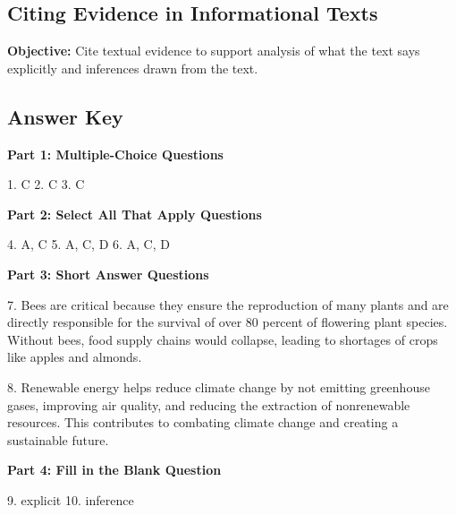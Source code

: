 \documentclass[12pt]{article}
\begin{document}
\subsection*{Citing Evidence in Informational Texts}
\onehalfspacing

\begin{tcolorbox}[colframe=black!40, colback=gray!0, title=Learning Objective]
\textbf{Objective:} Cite textual evidence to support analysis of what the text says explicitly and inferences drawn from the text.
\end{tcolorbox}

\subsection*{Answer Key}

\textbf{Part 1: Multiple-Choice Questions}

1. C  
2. C  
3. C  

\textbf{Part 2: Select All That Apply Questions}

4. A, C  
5. A, C, D  
6. A, C, D  

\textbf{Part 3: Short Answer Questions}

7. Bees are critical because they ensure the reproduction of many plants and are directly responsible for the survival of over 80 percent of flowering plant species. Without bees, food supply chains would collapse, leading to shortages of crops like apples and almonds.  

8. Renewable energy helps reduce climate change by not emitting greenhouse gases, improving air quality, and reducing the extraction of nonrenewable resources. This contributes to combating climate change and creating a sustainable future.  

\textbf{Part 4: Fill in the Blank Question}

9. explicit  
10. inference
\end{document}
